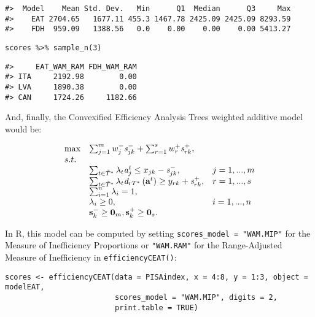 \begin{verbatim}
#>  Model    Mean Std. Dev.   Min      Q1  Median      Q3     Max
#>    EAT 2704.65   1677.11 455.3 1467.78 2425.09 2425.09 8293.59
#>    FDH  959.09   1388.56   0.0    0.00    0.00    0.00 5413.27
\end{verbatim}

\begin{verbatim}
scores %>% sample_n(3)
\end{verbatim}

\begin{verbatim}
#>     EAT_WAM_RAM FDH_WAM_RAM
#> ITA     2192.98        0.00
#> LVA     1890.38        0.00
#> CAN     1724.26     1182.66
\end{verbatim}

And, finally, the Convexified Efficiency Analysis Trees weighted additive model would be:

\begin{equation} \label{(34)} 
\begin{array}{lllll} 
{} & {\max } & {\sum_{j=1}^{m}w_{j}^{-} {\it s}_{jk}^{-} +\sum_{r=1}^{s}w_{r}^{+} {\it s}_{rk}^{+},} & {} & {} \\ 
{} & {s.t.} & {} & {} & {} \\ 
{} & {} & {\sum_{t\in \tilde{T}^{*}}^{}\lambda_{t} {\it a}_{j}^{t}  \le x_{jk} - {\it s}_{jk}^{-} ,} & {j=1,...,m} & {} \\
{} & {} & {\sum_{t\in \tilde{T}^{*}}^{}\lambda_{t} {\it d}_{rT^{*}} \left({\it \textbf{a}}^{t} \right) \ge y_{rk} +{\it s}_{rk}^{+} ,} & {r=1,...,s} & {} \\ 
{} & {} & {\sum_{i=1}^{n}\lambda_{i} = 1,} & {} & {} \\ 
{} & {} & {\lambda _{i} \ge 0,} & {i=1,...,n} & {} \\ 
{} & {} & {{\it \textbf{s}}_{k}^{-} \ge \textbf{0}_{m}, {\it \textbf{s}}_{k}^{+} \ge \textbf{0}_{s}.} 
\end{array}
\end{equation}

In R, this model can be computed by setting \texttt{scores\_model\ =\ "WAM.MIP"} for the Measure of Inefficiency Proportions or \texttt{"WAM.RAM"} for the Range-Adjusted Measure of Inefficiency in \texttt{efficiencyCEAT()}:

\begin{verbatim}
scores <- efficiencyCEAT(data = PISAindex, x = 4:8, y = 1:3, object = modelEAT,
                         scores_model = "WAM.MIP", digits = 2,
                         print.table = TRUE)
\end{verbatim}

